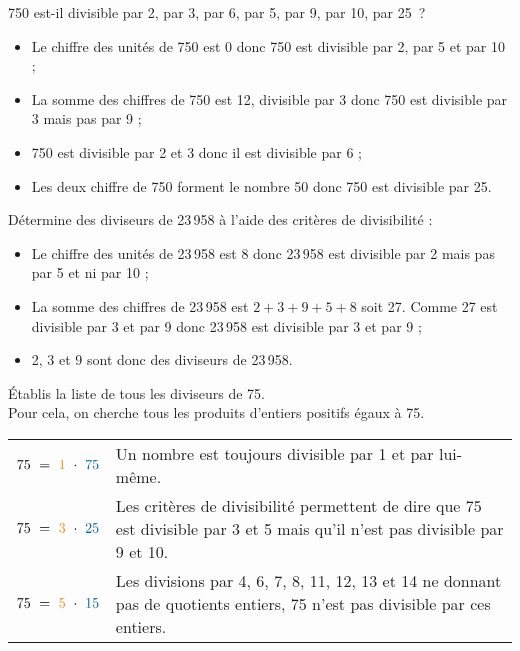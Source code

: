 \begin{methode*1}

\begin{exemple*1}
750 est-il divisible par 2, par 3, par 6, par 5, par 9, par 10, par 25 ?
\begin{itemize}
 \item Le chiffre des unités de 750 est 0 donc 750 est divisible par 2, par 5 et par 10 ;
 \item La somme des chiffres de 750 est 12, divisible par 3 donc 750 est divisible par 3 mais pas par 9 ;
 \item 750 est divisible par 2 et 3 donc il est divisible par 6 ;
 \item Les deux  chiffre de 750 forment le nombre 50 donc 750 est divisible par 25.
 \end{itemize}
 \end{exemple*1}
 
 \begin{exemple*1}
Détermine des diviseurs de 23\,958 à l'aide des critères de divisibilité :
\begin{itemize}
 \item Le chiffre des unités de 23\,958 est 8 donc 23\,958 est divisible par 2 mais pas par 5 et ni par 10 ;
 \item La somme des chiffres de 23\,958 est $2 + 3 + 9 + 5 + 8$ soit 27. Comme 27 est divisible par 3 et par 9 donc 23\,958 est divisible par 3 et par 9 ;
 \item 2, 3 et 9 sont donc des diviseurs de 23\,958.
 \end{itemize}
 \end{exemple*1}

\begin{exemple*1}
Établis la liste de tous les diviseurs de 75.\\[1em]
Pour cela, on cherche tous les produits d'entiers positifs égaux à 75. \\[1em]
\begin{tabularx}{\textwidth}{c|X}
 $75 = \textcolor{J1}{1} \cdot \textcolor{A1}{75}$ &  Un nombre est toujours divisible par 1 et par lui-même. \\ 
 $75 = \textcolor{J1}{3} \cdot \textcolor{A1}{25}$ & Les critères de divisibilité permettent de dire que 75 est divisible par 3 et 5 mais qu'il n'est pas divisible par 9 et 10. \\
 $75 = \textcolor{J1}{5} \cdot \textcolor{A1}{15}$ & Les divisions par 4, 6, 7, 8, 11, 12, 13 et 14 ne donnant pas de quotients entiers, 75 n'est pas divisible par ces entiers.
 

\end{tabularx}
\end{exemple*1}
\end{methode*1}
